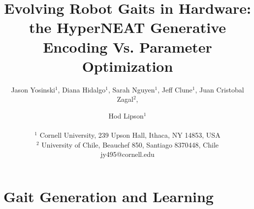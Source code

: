 \documentclass[letterpaper]{article}
\title{Evolving Robot Gaits in Hardware: the HyperNEAT Generative Encoding Vs. Parameter Optimization}
\author {Jason Yosinski$^{1}$,
Diana Hidalgo$^{1}$,
Sarah Nguyen$^{1}$,
Jeff Clune$^{1}$,
Juan Cristobal Zagal$^{2}$,
\and Hod Lipson$^{1}$\\
\mbox{} \\
$^1$ Cornell University, 239 Upson Hall, Ithaca, NY  14853, USA\\
$^2$ University of Chile, Beauchef 850, Santiago 8370448, Chile\\
jy495@cornell.edu}
\begin{document}
\maketitle

\begin{abstract}

\end{abstract}




%







\section{Gait Generation and Learning}











\footnotesize


\end{document}
